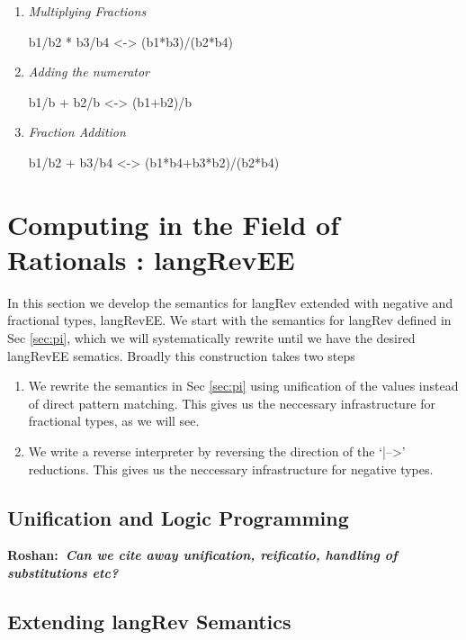 \documentclass[preprint]{sigplanconf}
\newcommand{\xcomment}[2]{\textbf{#1:~\textsl{#2}}}
\newcommand{\roshan}[1]{\xcomment{Roshan}{#1}}
\begin{document}
\begin{enumerate}

\item 
\emph{Multiplying Fractions}

{{b1/b2 * b3/b4 <-> (b1*b3)/(b2*b4)}}


\item 
\emph{Adding the numerator}

{{b1/b + b2/b <-> (b1+b2)/b}}

\item 
\emph{Fraction Addition}

{{b1/b2 + b3/b4 <-> (b1*b4+b3*b2)/(b2*b4) }}

\end{enumerate}

\section{Computing in the Field of Rationals : {{langRevEE}} }
\label{sec:rat}


In this section we develop the semantics for {{langRev}} extended with
negative and fractional types, {{langRevEE}}.  We start with the
semantics for {{langRev}} defined in Sec \ref{sec:pi}, which we will
systematically rewrite until we have the desired {{langRevEE}}
sematics. Broadly this construction takes two steps 

\begin{enumerate}
\item We rewrite the semantics in Sec \ref{sec:pi} using unification
  of the values instead of direct pattern matching. This gives us the
  neccessary infrastructure for fractional types, as we will see. 

\item We write a reverse interpreter by reversing the direction of the
  `{{|-->}}' reductions. This gives us the neccessary infrastructure for
  negative types.
\end{enumerate}

\subsection{Unification and Logic Programming}

\roshan{Can we cite away unification, reificatio, handling of
  substitutions etc?}

\subsection{Extending {{langRev}} Semantics}
\end{document}
